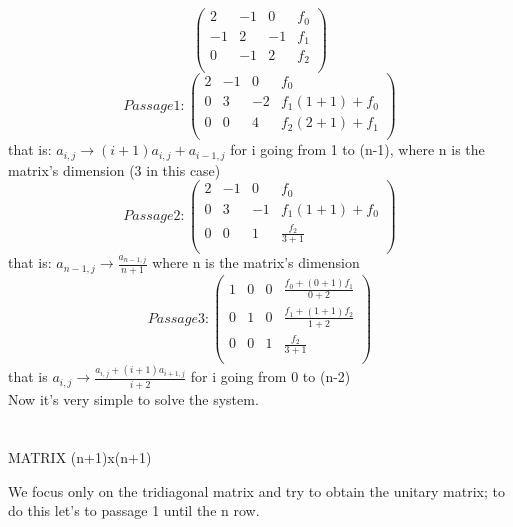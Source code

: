\documentclass {article}
\begin{document}
\begin{equation}
\left(
\begin{array}{ccc|c}
   2 & -1 & 0 & f_0 \\
   -1 & 2 & -1 & f_1 \\
   0 & -1 & 2 & f_2 \\
\end{array}    
\right)
\end{equation}
\begin{equation}
Passage 1:
\left(
\begin{array}{ccc|c}
   2 & -1 & 0 & f_0 \\
   0 & 3 & -2 & f_1(1+1)+f_0 \\
   0 & 0 & 4 & f_2(2+1)+f_1 \\
\end{array}
\right)
\end{equation}
that is: $a_{i,j} \rightarrow (i+1)a_{i,j}+a_{i-1,j}$ for i going from 1 to (n-1), where n is the matrix's dimension (3 in this case)
\begin{equation}
Passage 2:
\left(
\begin{array}{ccc|c}
  2 & -1 & 0 & f_0 \\
  0 & 3 & -1 & f_1(1+1)+f_0 \\
  0 & 0 & 1 & \frac{f_2}{3+1}\\ 
\end{array}
\right)
\end{equation}
that is: $a_{n-1,j} \rightarrow \frac{a_{n-1,j}}{n+1}$ where n is the matrix's dimension
\begin{equation}
Passage 3:
\left(
\begin{array}{ccc|c}
  1 & 0 & 0 & \frac{f_0+(0+1)f_1}{0+2} \\
  0 & 1 & 0 & \frac{f_1+(1+1)f_2}{1+2} \\
  0 & 0 & 1 & \frac{f_2}{3+1} \\
\end{array}
\right)
\end{equation}
that is $a_{i,j} \rightarrow \frac{a_{i,j}+(i+1)a_{i+1,j}}{i+2}$ for i going from 0 to (n-2)
\\
Now it's very simple to solve the system.
\\
\\
\\
MATRIX (n+1)x(n+1)

We focus only on the tridiagonal matrix and try to obtain the unitary matrix; to do this let's to passage 1 until the n row.
\end{document}
